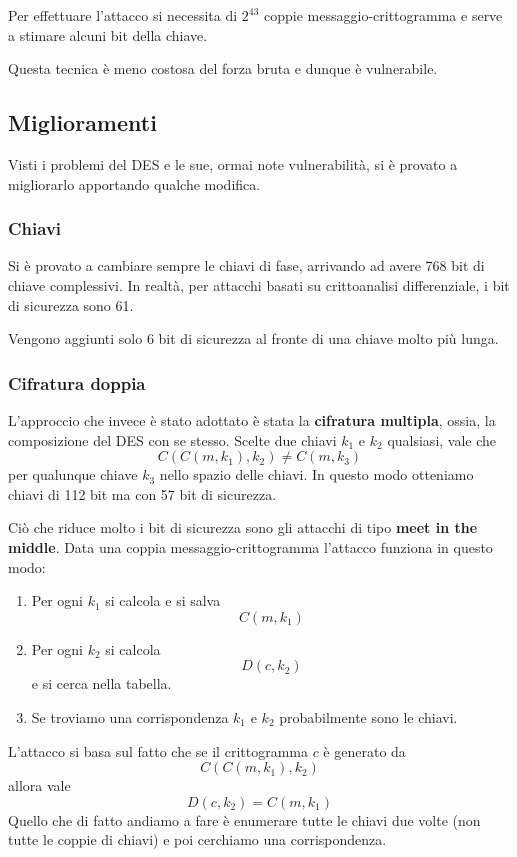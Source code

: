 Per effettuare l'attacco si necessita di $2^{43}$ coppie messaggio-crittogramma e serve a stimare alcuni bit della chiave.

Questa tecnica \`e meno costosa del forza bruta e dunque \`e vulnerabile.

\subsection{Miglioramenti}\label{miglioramenti_DES}
Visti i problemi del DES e le sue, ormai note vulnerabilit\`a, si \`e provato a migliorarlo apportando qualche modifica.

\subsubsection{Chiavi}
Si \`e provato a cambiare sempre le chiavi di fase, arrivando ad avere 768 bit di chiave complessivi. In realt\`a,
per attacchi basati su crittoanalisi differenziale, i bit di sicurezza sono 61.

Vengono aggiunti solo 6 bit di sicurezza al fronte di una chiave molto pi\`u lunga.

\subsubsection{Cifratura doppia}
L'approccio che invece \`e stato adottato \`e stata la \textbf{cifratura multipla}, ossia, la composizione del DES con
se stesso. Scelte due chiavi $k_1$ e $k_2$ qualsiasi, vale che
\[ C(C(m, k_1), k_2) \neq C(m, k_3) \]
per qualunque chiave $k_3$ nello spazio delle chiavi. In questo modo otteniamo chiavi di 112 bit ma con 57 bit di
sicurezza.

Ci\`o che riduce molto i bit di sicurezza sono gli attacchi di tipo \textbf{meet in the middle}. Data una coppia
messaggio-crittogramma l'attacco funziona in questo modo:
\begin{enumerate}
	\item Per ogni $k_1$ si calcola e si salva
	      \[ C(m, k_1) \]
	\item Per ogni $k_2$ si calcola
	      \[ D(c, k_2) \]
	      e si cerca nella tabella.
	\item Se troviamo una corrispondenza $k_1$ e $k_2$ probabilmente sono le chiavi.
\end{enumerate}
L'attacco si basa sul fatto che se il crittogramma $c$ \`e generato da
\[ C(C(m, k_1), k_2) \]
allora vale
\[ D(c, k_2) = C(m, k_1) \]
Quello che di fatto andiamo a fare \`e enumerare tutte le chiavi due volte (non tutte le coppie di chiavi) e poi cerchiamo
una corrispondenza.

